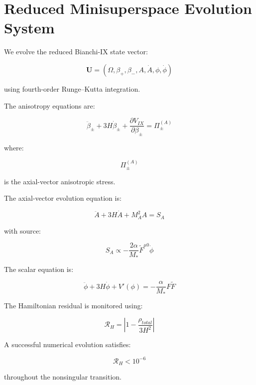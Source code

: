 \section{Reduced Minisuperspace Evolution System}

We evolve the reduced Bianchi-IX state vector:

\begin{equation}
\mathbf U =
(\Omega,\beta_+,\beta_-,A,\dot A,\phi,\dot\phi)
\end{equation}

using fourth-order Runge--Kutta integration.

The anisotropy equations are:

\begin{equation}
\ddot\beta_\pm + 3H\dot\beta_\pm + \frac{\partial V_{IX}}{\partial \beta_\pm} = \Pi_\pm^{(A)}
\end{equation}

where:

\begin{equation}
\Pi_\pm^{(A)}
\end{equation}

is the axial-vector anisotropic stress.

The axial-vector evolution equation is:

\begin{equation}
\ddot A + 3H\dot A + M_A^2 A
=
S_A
\end{equation}

with source:

\begin{equation}
S_A
\propto
-\frac{2\alpha}{M_*}
\tilde F^{\mu 0}\dot\phi
\end{equation}

The scalar equation is:

\begin{equation}
\ddot\phi + 3H\dot\phi + V'(\phi)
=
-\frac{\alpha}{M_*}F\tilde F
\end{equation}

The Hamiltonian residual is monitored using:

\begin{equation}
\mathcal R_H
=
\left|
1 - \frac{\rho_{total}}{3H^2}
\right|
\end{equation}

A successful numerical evolution satisfies:

\begin{equation}
\mathcal R_H < 10^{-6}
\end{equation}

throughout the nonsingular transition.
